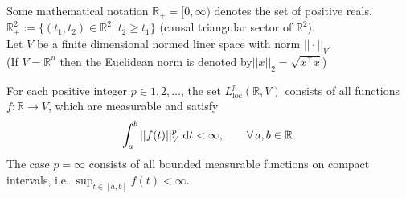 \documentclass[aspectratio=169]{beamer}
\newcommand{\bbR}{\mathbb{R}}
\begin{document}
\begin{frame}{Some mathematical notation}
$\bbR_+ = [0, \infty)$ denotes the set of positive reals. \\
$\bbR^2_+:=\{(t_1, t_2) \in \bbR^2 |\;  t_2\ge t_1\}$ (causal triangular sector of $\bbR^2$). \\
Let $V$ be a finite dimensional normed liner space with norm $||\cdot||_V$. \\
\vspace{.1cm}
(If $V=\bbR^n$ then the Euclidean norm is denoted by$||x||_2 = \sqrt{x^\top x}$)

\begin{definition}
	For each positive integer $p \in {1, 2, \dots}$, the set $L^p_{\text{loc}}(\bbR, V)$ consists of all functions $f : \bbR \rightarrow V$, which are measurable and satisfy
	\begin{equation*}
		\int_a^b ||f(t)||^p_V \d t< \infty, \qquad \forall\,  a, b \in \bbR.
	\end{equation*}
	The case $p=\infty$ consists of all bounded measurable functions on compact intervals, i.e. $\sup_{t \in [a, b]} f(t) < \infty.$
	
\end{definition}

\end{frame}
\end{document}
